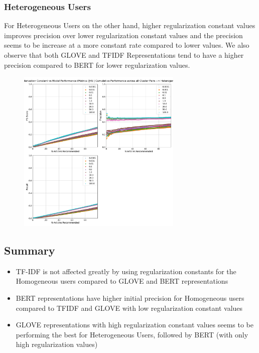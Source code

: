 \documentclass[a4paper,fontsize=8.0pt]{scrartcl}
\begin{document}
\subsubsection{Heterogeneous Users}
\begin{flushleft}
For Heterogeneous Users on the other hand, higher regularization constant values improves precision over lower regularization constant values and the precision seems to be increase at a more constant rate compared to lower values. We also observe that both GLOVE and TFIDF Representations tend to have a higher precision compared to BERT for lower regularization values.
\end{flushleft}
\vspace{-1ex}
\begin{figure}[H]
 \includegraphics[width=0.7\textwidth]{Graphs/BERT/regularization_vs_model_performance_cumu_Heterogeneous.pdf}
\end{figure}
\subsection{Summary}
\begin{itemize}
    \item TF-IDF is not affected greatly by using regularization constants for the Homogeneous users compared to GLOVE and BERT representations
    \item BERT representations have higher initial precision for Homogeneous users compared to TFIDF and GLOVE with low regularization constant values
    \item GLOVE representations with high regularization constant values seems to be performing the best for Heterogeneous Users, followed by BERT (with only high regularization values)
\end{itemize}
\end{document}
